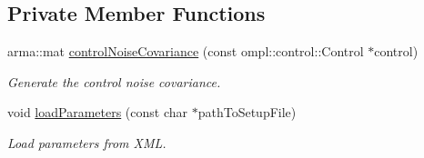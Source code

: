 \subsection*{Private Member Functions}
\begin{DoxyCompactItemize}
\item 
\hypertarget{class_omnidirectional_motion_model_a33a1ee6929d3dc39a0d3c28520db40c8}{arma\-::mat \hyperlink{class_omnidirectional_motion_model_a33a1ee6929d3dc39a0d3c28520db40c8}{control\-Noise\-Covariance} (const ompl\-::control\-::\-Control $\ast$control)}\label{class_omnidirectional_motion_model_a33a1ee6929d3dc39a0d3c28520db40c8}

\begin{DoxyCompactList}\small\item\em Generate the control noise covariance. \end{DoxyCompactList}\item 
\hypertarget{class_omnidirectional_motion_model_a44bdd875d3ce7ba0d11b4e5bc868108c}{void \hyperlink{class_omnidirectional_motion_model_a44bdd875d3ce7ba0d11b4e5bc868108c}{load\-Parameters} (const char $\ast$path\-To\-Setup\-File)}\label{class_omnidirectional_motion_model_a44bdd875d3ce7ba0d11b4e5bc868108c}

\begin{DoxyCompactList}\small\item\em Load parameters from X\-M\-L. \end{DoxyCompactList}\end{DoxyCompactItemize}
